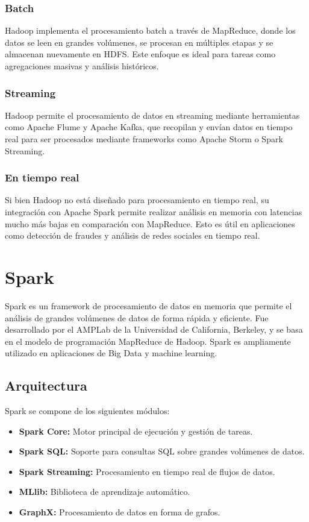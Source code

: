 \documentclass[12pt]{article}
\begin{document}
\subsubsection{Batch}
Hadoop implementa el procesamiento batch a través de MapReduce, donde los datos se leen en grandes volúmenes, se procesan en múltiples etapas y se almacenan nuevamente en HDFS. Este enfoque es ideal para tareas como agregaciones masivas y análisis históricos.

\subsubsection{Streaming}
Hadoop permite el procesamiento de datos en streaming mediante herramientas como Apache Flume y Apache Kafka, que recopilan y envían datos en tiempo real para ser procesados mediante frameworks como Apache Storm o Spark Streaming.

\subsubsection{En tiempo real}
Si bien Hadoop no está diseñado para procesamiento en tiempo real, su integración con Apache Spark permite realizar análisis en memoria con latencias mucho más bajas en comparación con MapReduce. Esto es útil en aplicaciones como detección de fraudes y análisis de redes sociales en tiempo real.



\section{Spark}

Spark es un framework de procesamiento de datos en memoria que permite el análisis de grandes volúmenes de datos de forma rápida y eficiente. 
Fue desarrollado por el AMPLab de la Universidad de California, Berkeley, y se basa en el modelo de programación MapReduce de Hadoop. Spark es ampliamente utilizado en aplicaciones de Big Data y machine learning.

\subsection{Arquitectura}
Spark se compone de los siguientes módulos:
\begin{itemize}
    \item \textbf{Spark Core:} Motor principal de ejecución y gestión de tareas.
    \item \textbf{Spark SQL:} Soporte para consultas SQL sobre grandes volúmenes de datos.
    \item \textbf{Spark Streaming:} Procesamiento en tiempo real de flujos de datos.
    \item \textbf{MLlib:} Biblioteca de aprendizaje automático.
    \item \textbf{GraphX:} Procesamiento de datos en forma de grafos.
\end{itemize}
\end{document}
